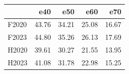 \begin{tabular}{lrrrr}
\toprule
 & e40 & e50 & e60 & e70 \\
\midrule
F2020 & 43.76 & 34.21 & 25.08 & 16.67 \\
F2023 & 44.80 & 35.26 & 26.13 & 17.69 \\
H2020 & 39.61 & 30.27 & 21.55 & 13.95 \\
H2023 & 41.08 & 31.78 & 22.98 & 15.25 \\
\bottomrule
\end{tabular}
